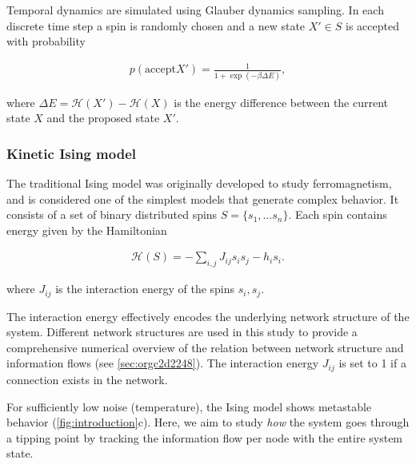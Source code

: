 \documentclass[a4paper, 11pt, twocolumn]{article}
\begin{document}
Temporal  dynamics  are  simulated  using  Glauber  dynamics
sampling.  In each  discrete time  step a  spin is  randomly
chosen  and  a   new  state  \(X'\in  S\)   is  accepted  with
probability

\begin{equation}
\label{eq:glauber}
\begin{split}
 p(  \text{accept} X'  ) =  \frac{1}{1 +
\exp(-\beta   \Delta  E)},
\end{split}
\end{equation}

where  \(\Delta E  =  \mathcal{H}(X') -  \mathcal{H}(X)\) is  the
energy difference  between the  current state \(X\)  and the
proposed state \(X'\).

\subsubsection{Kinetic Ising model}
\label{sec:orgb324012}
The  traditional Ising  model  was  originally developed  to
study ferromagnetism, and is  considered one of the simplest
models that generate complex behavior.  It consists of a set
of binary distributed spins \(S = \{s_1, \dots s_n\}\). Each
spin contains energy given by the Hamiltonian

\begin{equation}
\label{eq:energy}
\begin{split}
\mathcal{H}(S) = -\sum_{i,j} J_{ij} s_{i} s_{j} - h_{i} s_{i}.
\end{split}
\end{equation}

where  \(J_{ij}\) is  the  interaction energy  of the  spins
\(s_i, s_j\).

The  interaction energy  effectively encodes  the underlying
network   structure  of   the   system.  Different   network
structures are used in this study to provide a comprehensive
numerical overview of the relation between network structure
and  information   flows  (see  \ref{sec:orgc2d2248}).  The
interaction energy  \(J_{ij}\) is set  to 1 if  a connection
exists in the network.

For sufficiently  low noise  (temperature), the  Ising model
shows   metastable  behavior   (\cref{fig:introduction}{c}).
Here,  we aim  to  study  \emph{how} the  system  goes through  a
tipping point by tracking the information flow per node with
the entire system state.
\end{document}
